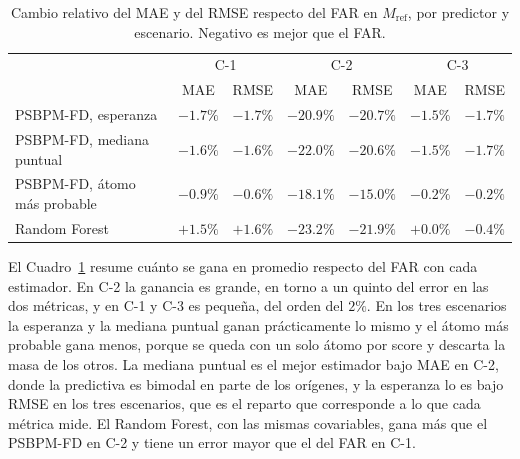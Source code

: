 \begin{table}[H]
\centering\small
\caption{Cambio relativo del MAE y del RMSE respecto del FAR en $M_{\mathrm{ref}}$, por predictor y escenario. Negativo es mejor que el FAR.}
\label{tab:res_bloqueA_ganancia}
\begin{tabular}{l cc cc cc}
\hline
 & \multicolumn{2}{c}{C-1} & \multicolumn{2}{c}{C-2} & \multicolumn{2}{c}{C-3} \\
 & MAE & RMSE & MAE & RMSE & MAE & RMSE \\
\hline
PSBPM-FD, esperanza & $-1.7\%$ & $-1.7\%$ & $-20.9\%$ & $-20.7\%$ & $-1.5\%$ & $-1.7\%$ \\
PSBPM-FD, mediana puntual & $-1.6\%$ & $-1.6\%$ & $-22.0\%$ & $-20.6\%$ & $-1.5\%$ & $-1.7\%$ \\
PSBPM-FD, átomo más probable & $-0.9\%$ & $-0.6\%$ & $-18.1\%$ & $-15.0\%$ & $-0.2\%$ & $-0.2\%$ \\
Random Forest & $+1.5\%$ & $+1.6\%$ & $-23.2\%$ & $-21.9\%$ & $+0.0\%$ & $-0.4\%$ \\
\hline
\end{tabular}
\end{table}

El Cuadro~\ref{tab:res_bloqueA_ganancia} resume cuánto se gana en promedio respecto del FAR con cada estimador. En C-2 la ganancia es grande, en torno a un quinto del error en las dos métricas, y en C-1 y C-3 es pequeña, del orden del $2\%$. En los tres escenarios la esperanza y la mediana puntual ganan prácticamente lo mismo y el átomo más probable gana menos, porque se queda con un solo átomo por score y descarta la masa de los otros. La mediana puntual es el mejor estimador bajo MAE en C-2, donde la predictiva es bimodal en parte de los orígenes, y la esperanza lo es bajo RMSE en los tres escenarios, que es el reparto que corresponde a lo que cada métrica mide. El Random Forest, con las mismas covariables, gana más que el PSBPM-FD en C-2 y tiene un error mayor que el del FAR en C-1.

